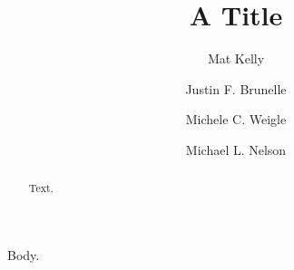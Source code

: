 \documentclass{llncs}
\begin{document}
\title{A Title}
\author{Mat Kelly \and Justin F. Brunelle \and Michele C. Weigle \and Michael L. Nelson}
\maketitle
\begin{abstract}Text.\end{abstract}
Body.
\end{document}
